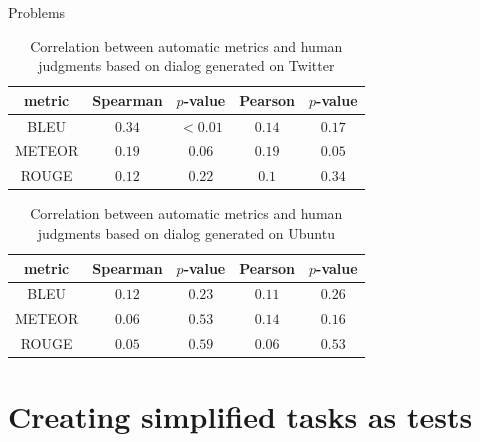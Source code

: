\documentclass[10pt]{beamer}
\begin{document}
\begin{frame}{Problems \cite{LiuLSNCP16}}

\begin{table}[h]
\centering
\label{hownottable}
\begin{tabular}{|c|c|c|c|c|}
\hline
\cellcolor{blue!50} metric & \cellcolor{blue!50} Spearman & \cellcolor{blue!50} $p$-value & \cellcolor{blue!50} Pearson &  \cellcolor{blue!50} $p$-value \\ \hline
BLEU   & $0.34$   & $< 0.01$  & $0.14$  & $0.17$ \\ \hline
METEOR & $0.19$   & $0.06$    & $0.19$  & $0.05$ \\ \hline
ROUGE  & $0.12$   & $0.22$    & $0.1$   & $0.34$ \\ \hline  
\end{tabular}
\caption{Correlation between automatic metrics and human judgments based on dialog generated on Twitter}
\end{table}

\begin{table}[h]
\centering
\label{hownottable}
\begin{tabular}{|c|c|c|c|c|}
\hline
\cellcolor{blue!50} metric & \cellcolor{blue!50} Spearman & \cellcolor{blue!50} $p$-value & \cellcolor{blue!50} Pearson &  \cellcolor{blue!50} $p$-value \\ \hline
BLEU & $0.12$   & $0.23$    & $0.11$  & $0.26$    \\ \hline
METEOR & $0.06$   & $0.53$    & $0.14$  & $0.16$     \\ \hline
ROUGE & $0.05$   & $0.59$    & $0.06$  & $0.53$    \\ \hline
\end{tabular}
\caption{Correlation between automatic metrics and human judgments based on dialog generated on Ubuntu}
\end{table}
\end{frame}

\section{Creating simplified tasks as tests}
\end{document}
